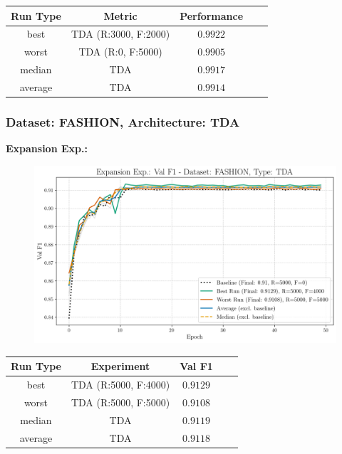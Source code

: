 \begin{table}[H]
	\centering
	\vspace{-1em}
	\begin{tabular}{|c|c|c|c|c|}
		\hline
		Run Type & Metric & Performance \\ \hline
		best & TDA (R:3000, F:2000) & $0.9922$\\ \hline
		worst & TDA (R:0, F:5000) & $0.9905$\\ \hline
		median & TDA & $0.9917$\\ \hline
		average & TDA & $0.9914$
		\\ \hline
	\end{tabular}
\end{table}
\newpage
\subsubsection{Dataset: FASHION, Architecture: TDA}
\noindent\textbf{Expansion Exp.:}
\begin{figure}[htbp]
	\centering
	\includegraphics[width=.85\textwidth]{abb/strat_classifier_performance/tda_fashion_mnist/expansion_experiments/val_f1_score_tda_fashion_mnist_fashion_all.png}
	\label{fig:app_strat_class_performance_expansion_exp._val_f1_score_}
\end{figure}
\begin{table}[H]
	\centering
	\vspace{-1em}
	\begin{tabular}{|c|c|c|c|c|}
		\hline
		Run Type & Experiment & Val F1 \\ \hline
		best & TDA (R:5000, F:4000) & $0.9129$\\ \hline
		worst & TDA (R:5000, F:5000) & $0.9108$\\ \hline
		median & TDA & $0.9119$\\ \hline
		average & TDA & $0.9118$
		\\ \hline
	\end{tabular}
\end{table}

